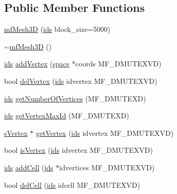 \subsection*{Public Member Functions}
\begin{DoxyCompactItemize}
\item 
\hyperlink{classmf_1_1mfMesh3D_a91b5fd82f7f202d9b01519e4baad3f93}{mfMesh3D} (\hyperlink{classmf_1_1mfMesh3D_aeae559d0564bf64617c8fd83ba264895}{ids} block\_\-size=5000)
\item 
\hyperlink{classmf_1_1mfMesh3D_af54049813d1e1050fc123fcbca6b10c1}{$\sim$mfMesh3D} ()
\item 
\hyperlink{classmf_1_1mfMesh3D_aeae559d0564bf64617c8fd83ba264895}{ids} \hyperlink{classmf_1_1mfMesh3D_acd7ae4e46082dc88ff6a2ec0e3833997}{addVertex} (\hyperlink{classmf_1_1mfMesh3D_aea7155b49fb50982a399056973e6b4d8}{space} $\ast$coords MF\_\-DMUTEXVD)
\item 
bool \hyperlink{classmf_1_1mfMesh3D_a6cef73e9208a423066e439f30c852a0a}{delVertex} (\hyperlink{classmf_1_1mfMesh3D_aeae559d0564bf64617c8fd83ba264895}{ids} idvertex MF\_\-DMUTEXVD)
\item 
\hyperlink{classmf_1_1mfMesh3D_aeae559d0564bf64617c8fd83ba264895}{ids} \hyperlink{classmf_1_1mfMesh3D_a542735e173f7c4937bd9fd6ae9dae715}{getNumberOfVertices} (MF\_\-DMUTEXD)
\item 
\hyperlink{classmf_1_1mfMesh3D_aeae559d0564bf64617c8fd83ba264895}{ids} \hyperlink{classmf_1_1mfMesh3D_a3ad267a7abdfec7e511c93031b6304a3}{getVertexMaxId} (MF\_\-DMUTEXD)
\item 
\hyperlink{classmf_1_1mfMesh3D_ac523ee47bc707949d351f9f73d09677e}{sVertex} $\ast$ \hyperlink{classmf_1_1mfMesh3D_ab3b20eb8024e905f22dca14b139ec1a8}{getVertex} (\hyperlink{classmf_1_1mfMesh3D_aeae559d0564bf64617c8fd83ba264895}{ids} idvertex MF\_\-DMUTEXVD)
\item 
bool \hyperlink{classmf_1_1mfMesh3D_afec11a472590da7e8f7740a0bddce106}{isVertex} (\hyperlink{classmf_1_1mfMesh3D_aeae559d0564bf64617c8fd83ba264895}{ids} idvertex MF\_\-DMUTEXVD)
\item 
\hyperlink{classmf_1_1mfMesh3D_aeae559d0564bf64617c8fd83ba264895}{ids} \hyperlink{classmf_1_1mfMesh3D_a237521684246bd6c5171e72aa95cdf2b}{addCell} (\hyperlink{classmf_1_1mfMesh3D_aeae559d0564bf64617c8fd83ba264895}{ids} $\ast$idvertices MF\_\-DMUTEXVD)
\item 
bool \hyperlink{classmf_1_1mfMesh3D_a75f082e8b945188ab1996193a527b143}{delCell} (\hyperlink{classmf_1_1mfMesh3D_aeae559d0564bf64617c8fd83ba264895}{ids} idcell MF\_\-DMUTEXVD)

\end{DoxyCompactItemize}
